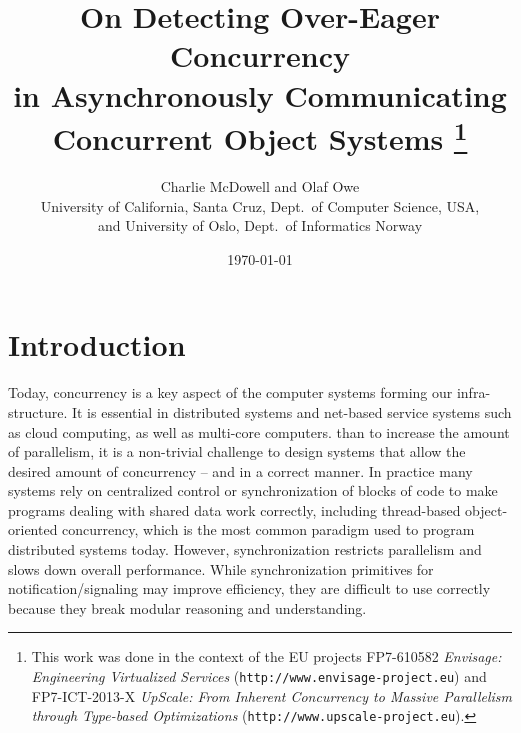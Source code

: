 \documentclass[12pt]{article}%
\begin{document}
\title{On Detecting Over-Eager Concurrency  \\
       in  Asynchronously Communicating  \\
       Concurrent Object Systems%
\thanks{This work was done in the context of the EU projects
   FP7-610582  \emph{Envisage: Engineering Virtualized Services}
    (\texttt{http://www.envisage-project.eu}) and
FP7-ICT-2013-X \emph{UpScale: From Inherent Concurrency to Massive 
Parallelism through Type-based Optimizations}
  (\texttt{http://www.upscale-project.eu}).}}

\author{Charlie McDowell and Olaf Owe\\
 \small{University of California, Santa Cruz, Dept.\ of Computer Science, USA, }\\
 \small{and University of Oslo, Dept.\  of Informatics Norway} 
 }
\date{\today}
\maketitle

\lstset{language=ABS}
\lstset{basicstyle=\ttfamily}


\section{Introduction}


Today, concurrency is a key aspect of the computer systems forming our
infra-structure. It is essential in distributed systems and net-based
service systems such as cloud computing, %
as well as %
multi-core computers.
 than to increase the amount
of parallelism, 
it is a non-trivial 
challenge to design systems that 
allow %
the desired amount of concurrency --  and in a correct manner.  In
practice many systems rely on centralized control or
synchronization of blocks of code to
make programs dealing with shared data work correctly, including
thread-based object-oriented concurrency, which is %
the most common paradigm used to program distributed systems today.  
However, synchronization restricts parallelism
and slows down overall performance.  
While synchronization 
primitives for notification/signaling may improve efficiency, they 
are difficult to use correctly because they break modular reasoning and
understanding.
\end{document}
